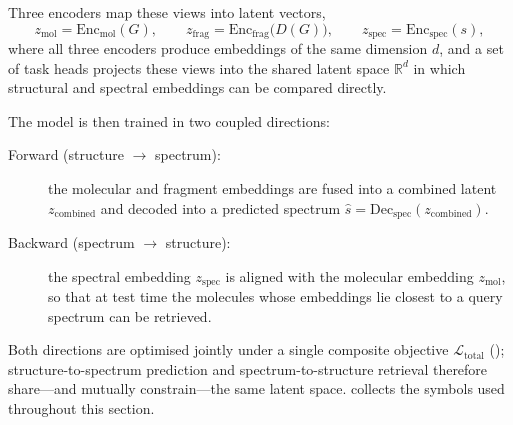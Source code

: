 Three encoders map these views into latent vectors,
\begin{equation}
    \label{eq:encoders}
    z_{\mathrm{mol}} = \mathrm{Enc}_{\mathrm{mol}}(G), \qquad
    z_{\mathrm{frag}} = \mathrm{Enc}_{\mathrm{frag}}\!\bigl(D(G)\bigr), \qquad
    z_{\mathrm{spec}} = \mathrm{Enc}_{\mathrm{spec}}(s),
\end{equation}
where all three encoders produce embeddings of the same dimension $d$, and a set of task heads projects these views into the shared latent space $\mathbb{R}^{d}$ in which structural and spectral embeddings can be compared directly.

The model is then trained in two coupled directions:
\begin{description}
    \item[Forward (structure $\rightarrow$ spectrum):] the molecular and fragment embeddings are fused into a combined latent $z_{\mathrm{combined}}$ and decoded into a predicted spectrum $\hat{s} = \mathrm{Dec}_{\mathrm{spec}}(z_{\mathrm{combined}})$.
    \item[Backward (spectrum $\rightarrow$ structure):] the spectral embedding $z_{\mathrm{spec}}$ is aligned with the molecular embedding $z_{\mathrm{mol}}$, so that at test time the molecules whose embeddings lie closest to a query spectrum can be retrieved.
\end{description}

Both directions are optimised jointly under a single composite objective $\mathcal{L}_{\mathrm{total}}$ (); structure-to-spectrum prediction and spectrum-to-structure retrieval therefore share---and mutually constrain---the same latent space.
 collects the symbols used throughout this section.

